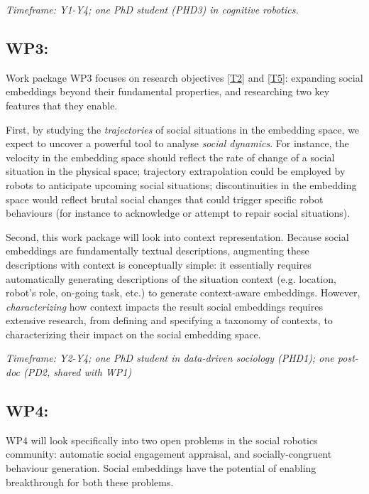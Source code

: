 \vspace{1em}
\noindent\emph{Timeframe: Y1-Y4; one PhD student (PHD3) in cognitive
    robotics.}


\subsection{WP3: \textbf{\wpThree}} 

Work package WP3 focuses on research objectives \ref{T2} and \ref{T5}: expanding
social embeddings beyond their fundamental properties, and researching two key
features that they enable.

First, by studying the \emph{trajectories} of social situations in the embedding
space, we expect to uncover a powerful tool to analyse \emph{social dynamics}.
For instance, the velocity in the embedding space should reflect the rate of
change of a social situation in the physical space; trajectory extrapolation
could be employed by robots to anticipate upcoming social situations;
discontinuities in the embedding space would reflect brutal social changes that
could trigger specific robot behaviours (for instance to acknowledge or attempt
to repair social situations).

Second, this work package will look into context representation. Because social
embeddings are fundamentally textual descriptions, augmenting these descriptions
with context is conceptually simple: it essentially requires automatically
generating descriptions of the situation context (e.g. location, robot's role,
on-going task, etc.) to generate context-aware embeddings. However,
\emph{characterizing} how context impacts the result social embeddings requires
extensive research, from defining and specifying a taxonomy of contexts, to
characterizing their impact on the social embedding space.


\vspace{1em}
\noindent\emph{Timeframe: Y2-Y4; one PhD student in data-driven sociology
    (PHD1); one post-doc (PD2, shared with WP1)}

\subsection{WP4: \textbf{\wpFour}}

WP4 will look specifically into two open problems in the
social robotics community: automatic social engagement appraisal, and
socially-congruent behaviour generation. Social embeddings have the potential of
enabling breakthrough for both these problems.

